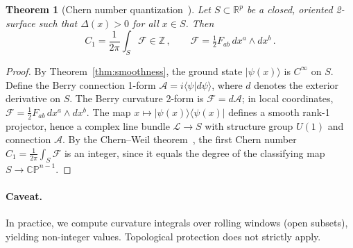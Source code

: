 \documentclass[3p]{elsarticle}
\newtheorem{theorem}{Theorem}
\newcommand{\ket}[1]{|#1\rangle}
\newcommand{\bra}[1]{\langle#1|}
\newcommand{\braket}[2]{\langle#1|#2\rangle}
\newcommand{\R}{\mathbb{R}}
\newcommand{\CP}{\mathbb{CP}}
\begin{document}
\begin{theorem}[Chern number quantization~\cite{abanov2025}]%
\label{thm:chern}
Let $S \subset \R^p$ be a closed, oriented 2-surface such that
$\Delta(x) > 0$ for all $x \in S$.  Then
\begin{equation}\label{eq:chern}
  C_1 = \frac{1}{2\pi} \int_S \mathcal{F} \in \mathbb{Z}\,,
  \qquad \mathcal{F} = \tfrac{1}{2}F_{ab}\,dx^a \wedge dx^b\,.
\end{equation}
\end{theorem}
\begin{proof}
By Theorem~\ref{thm:smoothness}, the ground state
$\ket{\psi(x)}$ is $C^\infty$ on $S$.  Define the Berry connection
1-form $\mathcal{A} = i\braket{\psi}{d\psi}$, where $d$ denotes the
exterior derivative on $S$.  The Berry curvature 2-form is
$\mathcal{F} = d\mathcal{A}$; in local coordinates,
$\mathcal{F} = \tfrac{1}{2}F_{ab}\,dx^a \wedge dx^b$.
The map $x \mapsto \ket{\psi(x)}\bra{\psi(x)}$ defines a smooth
rank-1 projector, hence a complex line bundle $\mathcal{L} \to S$
with structure group $U(1)$ and connection $\mathcal{A}$.
By the Chern--Weil theorem~\cite{chern1946,nakahara2003}, the
first Chern number
$C_1 = \frac{1}{2\pi}\int_S \mathcal{F}$
is an integer, since it equals the degree of the classifying map
$S \to \CP^{n-1}$.
\end{proof}

\paragraph{Caveat.}  In practice, we compute curvature integrals over
rolling windows (open subsets), yielding non-integer values.
Topological protection does not strictly apply.
\end{document}
